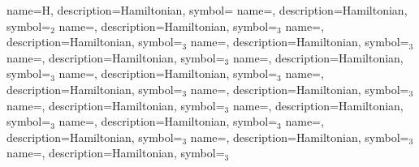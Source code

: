 {name={H}, %
 description={Hamiltonian}, %
 symbol={\hamiltonian} %
}
{name={{\hamiltonian}}, %
 description={Hamiltonian}, %
 symbol={\hamiltonian$_2$} %
}
{name={{\hamiltonian}}, %
 description={Hamiltonian}, %
 symbol={\hamiltonian$_3$} %
}
{name={{\hamiltonian}}, %
 description={Hamiltonian}, %
 symbol={\hamiltonian$_3$} %
}
{name={{\hamiltonian}}, %
 description={Hamiltonian}, %
 symbol={\hamiltonian$_3$} %
}
{name={{\hamiltonian}}, %
 description={Hamiltonian}, %
 symbol={\hamiltonian$_3$} %
}
{name={{\hamiltonian}}, %
 description={Hamiltonian}, %
 symbol={\hamiltonian$_3$} %
}
{name={{\hamiltonian}}, %
 description={Hamiltonian}, %
 symbol={\hamiltonian$_3$} %
}
{name={{\hamiltonian}}, %
 description={Hamiltonian}, %
 symbol={\hamiltonian$_3$} %
}
{name={{\hamiltonian}}, %
 description={Hamiltonian}, %
 symbol={\hamiltonian$_3$} %
}
{name={{\hamiltonian}}, %
 description={Hamiltonian}, %
 symbol={\hamiltonian$_3$} %
}
{name={{\hamiltonian}}, %
 description={Hamiltonian}, %
 symbol={\hamiltonian$_3$} %
}
{name={{\hamiltonian}}, %
 description={Hamiltonian}, %
 symbol={\hamiltonian$_3$} %
}
{name={{\hamiltonian}}, %
 description={Hamiltonian}, %
 symbol={\hamiltonian$_3$} %
}
{name={{\hamiltonian}}, %
 description={Hamiltonian}, %
 symbol={\hamiltonian$_3$} %
}
{name={{\hamiltonian}}, %
 description={Hamiltonian}, %
 symbol={\hamiltonian$_3$} %
}
